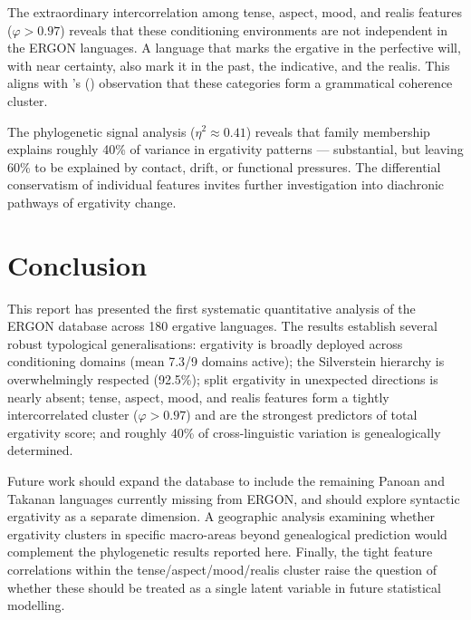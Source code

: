 \documentclass[12pt, a4paper]{article}
\begin{document}
The extraordinary intercorrelation among tense, aspect, mood, and realis features
($\varphi > 0.97$) reveals that these conditioning environments are not
independent in the ERGON languages. A language that marks the ergative in the
perfective will, with near certainty, also mark it in the past, the indicative,
and the realis. This aligns with \citeauthor{bybee1994}'s
(\citeyear{bybee1994}) observation that these categories form a grammatical
coherence cluster.

The phylogenetic signal analysis ($\eta^2 \approx 0.41$) reveals that family
membership explains roughly 40\% of variance in ergativity patterns --- substantial,
but leaving 60\% to be explained by contact, drift, or functional pressures. The
differential conservatism of individual features invites further investigation into
diachronic pathways of ergativity change.

\section{Conclusion}

This report has presented the first systematic quantitative analysis of the ERGON
database across 180 ergative languages. The results establish several robust
typological generalisations: ergativity is broadly deployed across conditioning
domains (mean 7.3/9 domains active); the Silverstein hierarchy is overwhelmingly
respected (92.5\%); split ergativity in unexpected directions is nearly absent;
tense, aspect, mood, and realis features form a tightly intercorrelated cluster
($\varphi > 0.97$) and are the strongest predictors of total ergativity score; and
roughly 40\% of cross-linguistic variation is genealogically determined.

Future work should expand the database to include the remaining Panoan and Takanan
languages currently missing from ERGON, and should explore syntactic ergativity as
a separate dimension. A geographic analysis examining whether ergativity clusters in
specific macro-areas beyond genealogical prediction would complement the
phylogenetic results reported here. Finally, the tight feature correlations within
the tense/aspect/mood/realis cluster raise the question of whether these should be
treated as a single latent variable in future statistical modelling.



\end{document}
